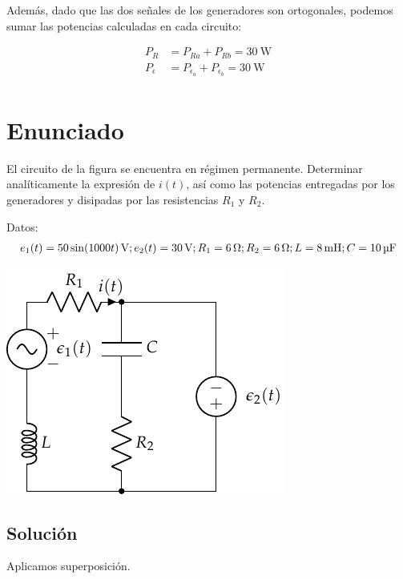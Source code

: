 Además, dado que las dos señales de los generadores son ortogonales, podemos sumar las potencias calculadas en cada circuito:

\begin{align*}
  P_R &= P_{Ra} + P_{Rb} = \qty{30}{\watt}\\
  P_\epsilon &= P_{\epsilon_a} + P_{\epsilon_b} = \qty{30}{\watt}\\
\end{align*}


\section{Enunciado}
El circuito de la figura se encuentra en régimen permanente. Determinar analíticamente la expresión de $i(t)$, así como las potencias entregadas por los generadores y disipadas por las resistencias $R_1$ y $R_2$.

Datos:
\begin{align*}
  e_1(t) = \qty[parse-numbers=false]{50 \sin(1000 t)}{\volt};
  e_2(t) = \qty{30}{\volt};
  R_1 = \qty{6}{\ohm};
  R_2 = \qty{6}{\ohm};
  L = \qty{8}{\milli\henry};
  C = \qty{10}{\micro\farad}
\end{align*}

\begin{center}
  \includegraphics{figuras/superposicion1_ej.pdf}
\end{center}

 \subsection*{Solución}

Aplicamos superposición.


